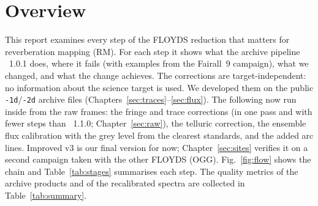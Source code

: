 \section*{Overview}

This report examines every step of the FLOYDS reduction that matters for reverberation mapping (RM). For each step
it shows what the archive pipeline \banzai{}~1.0.1 does, where it fails (with examples from the Fairall~9 campaign),
what we changed, and what the change achieves. The corrections are target-independent: no information about the
science target is used. We developed them on the public \texttt{-1d}/\texttt{-2d} archive files
(Chapters~\ref{sec:traces}--\ref{sec:flux}). The following now run inside \banzai{} from the raw frames: the fringe and
trace corrections (in one pass and with fewer steps than \banzai{}~1.1.0; Chapter~\ref{sec:raw}), the telluric
correction, the ensemble flux calibration with the grey level from the clearest standards, and the added arc lines.
Improved v3 is our final version for now; Chapter~\ref{sec:sites} verifies it on a second campaign taken with the
other FLOYDS (OGG).
Fig.~\ref{fig:flow} shows the chain and Table~\ref{tab:stages} summarises each step. The quality metrics of the
archive products and of the recalibrated spectra are collected in Table~\ref{tab:summary}.



